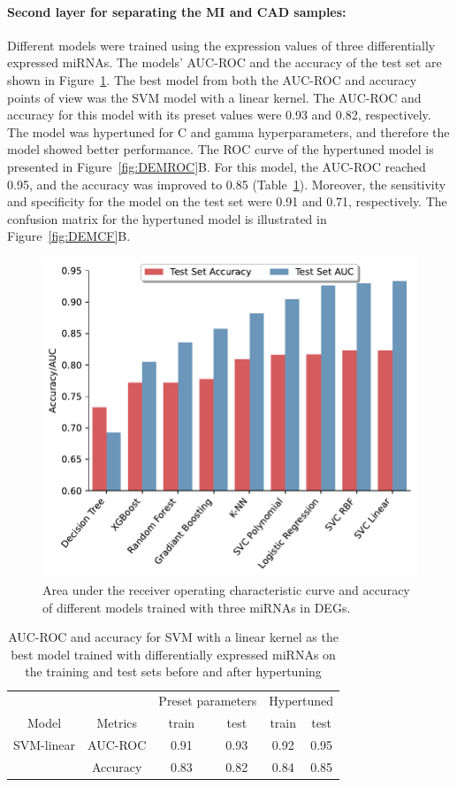 \documentclass[sn-mathphys,Numbered]{sn-jnl}%
\theoremstyle{thmstyleone}%
\theoremstyle{thmstyletwo}%
\theoremstyle{thmstylethree}%
\begin{document}
\paragraph{Second layer for separating the MI and CAD
samples:}\label{second-layer-for-separating-the-mi-and-cad-samples-2}

Different models were trained using the expression values of three
differentially expressed miRNAs. The models' AUC-ROC and the accuracy of
the test set are shown in Figure~\ref{fig:DEMmodels}. The best model
from both the AUC-ROC and accuracy points of view was the SVM model with
a linear kernel. The AUC-ROC and accuracy for this model with its preset
values were 0.93 and 0.82, respectively. The model was hypertuned for C
and gamma hyperparameters, and therefore the model showed better
performance. The ROC curve of the hypertuned model is presented in
Figure~\ref{fig:DEMROC}B. For this model, the AUC-ROC reached 0.95, and
the accuracy was improved to 0.85 (Table~\ref{tab:DEGsML}). Moreover,
the sensitivity and specificity for the model on the test set were 0.91
and 0.71, respectively. The confusion matrix for the hypertuned model is
illustrated in Figure~\ref{fig:DEMCF}B.

\begin{figure}
\centering
\includegraphics[width=0.65\linewidth]{Models DEGs mirs}
\caption{Area under the receiver operating characteristic curve and accuracy of different models trained with three miRNAs in DEGs.}\label{fig:DEMmodels}
\end{figure}


\begin{table}
\centering
\caption{AUC-ROC and accuracy for SVM with a linear kernel as the best model trained with differentially expressed miRNAs on the training and test sets before and after hypertuning}
\label{tab:DEGsML}
\begin{tabular}{cccccc}
\toprule
\multicolumn{2}{c}{} & \multicolumn{2}{c}{Preset parameters} & \multicolumn{2}{c}{Hypertuned} \\
\cmidrule(lr){3-4} \cmidrule(lr){5-6}
Model & Metrics & train & test & train & test\\
\midrule
SVM-linear & AUC-ROC & 0.91 & 0.93 & 0.92 & 0.95\\
& Accuracy & 0.83 & 0.82 & 0.84 & 0.85\\
\bottomrule
\end{tabular}
\end{table}
\end{document}
